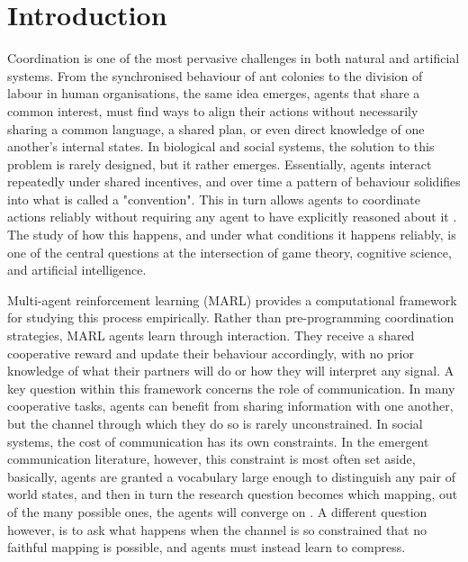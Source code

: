 \documentclass[a4paper,twoside,12pt]{report}
\begin{document}
    
    \tableofcontents
    \newpage
    \listoffigures
    \newpage
    \listoftables
    \newpage
    
    \chapter{Introduction}
    Coordination is one of the most pervasive challenges in both natural and
    artificial systems. From the synchronised behaviour of ant colonies to the
    division of labour in human organisations, the same idea emerges, agents that share a common interest,
    must find ways to align their actions without necessarily sharing a common
    language, a shared plan, or even direct knowledge of one another's internal
    states. In biological and social systems, the solution to this problem is rarely designed, but it rather emerges. Essentially, agents interact repeatedly under shared incentives,
    and over time a pattern of behaviour solidifies into what is called a "convention". This in turn allows agents to coordinate actions reliably without requiring any agent to have explicitly reasoned about it \citep{skyrms2010}. The study of how this happens,
    and under what conditions it happens reliably, is one of the central questions at the intersection of game theory, cognitive science, and artificial intelligence.
    \newline
    
    Multi-agent reinforcement learning (MARL) provides a computational framework
    for studying this process empirically. Rather than pre-programming coordination
    strategies, MARL agents learn through interaction. They receive a shared
    cooperative reward and update their behaviour accordingly, with no prior
    knowledge of what their partners will do or how they will interpret any signal. A key question within this framework concerns the role of communication. In
    many cooperative tasks, agents can benefit from sharing information with one
    another, but the channel through which they do so is rarely unconstrained. In social systems, the cost of communication has its own
    constraints. In the emergent communication literature, however, this constraint is most often set aside, basically, agents are granted a vocabulary large enough to distinguish any pair of world states, and then in turn the research question becomes which
    mapping, out of the many possible ones, the agents will converge on
    \citep{lazaridou2020}. A different question however, is to ask what happens when the channel is so constrained that no faithful mapping is possible, and agents must instead learn to compress.
    \newline
    
\end{document}
